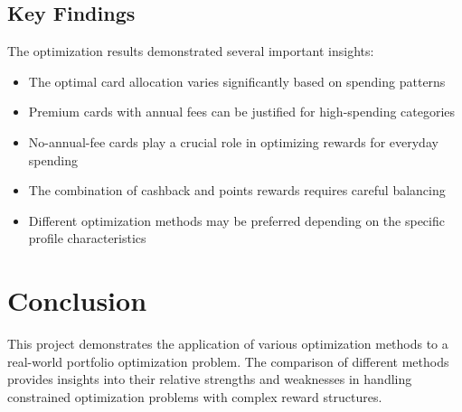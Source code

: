 \documentclass{article}
\begin{document}
\subsection{Key Findings}
The optimization results demonstrated several important insights:

\begin{itemize}
    \item The optimal card allocation varies significantly based on spending patterns
    \item Premium cards with annual fees can be justified for high-spending categories
    \item No-annual-fee cards play a crucial role in optimizing rewards for everyday spending
    \item The combination of cashback and points rewards requires careful balancing
    \item Different optimization methods may be preferred depending on the specific profile characteristics
\end{itemize}

\section{Conclusion}
This project demonstrates the application of various optimization methods to a real-world portfolio optimization problem. The comparison of different methods provides insights into their relative strengths and weaknesses in handling constrained optimization problems with complex reward structures.
\end{document}
